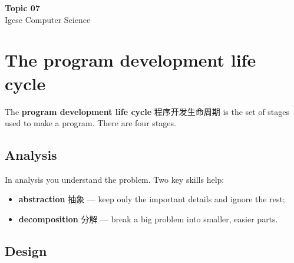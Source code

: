 \documentclass[11pt]{article}
\begin{document}
\begin{center}
  {\LARGE\bfseries Topic 07}\\[0.35em]
  {\large Igcse Computer Science}
\end{center}
\vspace{0.6em}

\section*{The program development life cycle}

The \textbf{program development life cycle} 程序开发生命周期 is the set of stages used to make a program. There are four stages.

\begin{center}
\end{center}

\subsection*{Analysis}

In analysis you understand the problem. Two key skills help:

\begin{itemize}
\item \textbf{abstraction} 抽象 — keep only the important details and ignore the rest;

\item \textbf{decomposition} 分解 — break a big problem into smaller, easier parts.

\end{itemize}

\subsection*{Design}
\end{document}
